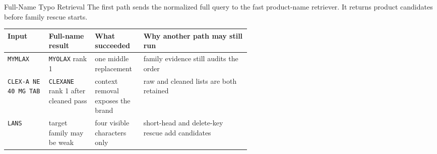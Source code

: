\documentclass[aspectratio=169,10pt]{beamer}
\newcommand{\code}[1]{\texttt{#1}}
\begin{document}
\begin{frame}{Full-Name Typo Retrieval}
\small
The first path sends the normalized full query to the fast product-name
retriever. It returns product candidates before family rescue starts.

\begin{center}
\end{center}

\begin{table}
\centering
\scriptsize
\begin{tabularx}{\linewidth}{@{}L{0.17\linewidth}L{0.19\linewidth}L{0.20\linewidth}Y@{}}
\toprule
\textbf{Input} & \textbf{Full-name result} & \textbf{What succeeded} & \textbf{Why another path may still run} \\
\midrule
\code{MYMLAX} & \code{MYOLAX} rank 1 & one middle replacement & family evidence still audits the order \\
\code{CLEX-A NE 40 MG TAB} & \code{CLEXANE} rank 1 after cleaned pass & context removal exposes the brand & raw and cleaned lists are both retained \\
\code{LANS} & target family may be weak & four visible characters only & short-head and delete-key rescue add candidates \\
\bottomrule
\end{tabularx}
\end{table}
\end{frame}
\end{document}

